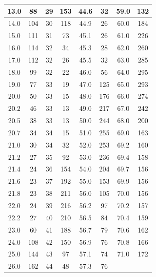 \documentclass[UTF8,10pt,a4paper]{article}
\begin{document}
\begin{table}[h]
\begin{tabular}{|c|c|c|c|c|c|c|c|}
    13.0 & 88 & 29 & 153 & 44.6 & 32 & 59.0 & 132 \\ \hline
    14.0 & 104 & 30 & 118 & 44.9 & 26 & 60.0 & 184 \\ \hline
    15.0 & 111 & 31 & 73 & 45.1 & 26 & 61.0 & 226 \\ \hline
    16.0 & 114 & 32 & 34 & 45.3 & 28 & 62.0 & 260 \\ \hline
    17.0 & 112 & 32 & 26 & 45.5 & 32 & 63.0 & 285 \\ \hline
    18.0 & 99 & 32 & 22 & 46.0 & 56 & 64.0 & 295 \\ \hline
    19.0 & 77 & 33 & 19 & 47.0 & 125 & 65.0 & 293 \\ \hline
    20.0 & 50 & 33 & 15 & 48.0 & 176 & 66.0 & 274 \\ \hline
    20.2 & 46 & 33 & 13 & 49.0 & 217 & 67.0 & 242 \\ \hline
    20.5 & 38 & 33 & 13 & 50.0 & 244 & 68.0 & 200 \\ \hline
    20.7 & 34 & 34 & 15 & 51.0 & 255 & 69.0 & 163 \\ \hline
    21.0 & 30 & 34 & 32 & 52.0 & 253 & 69.2 & 160 \\ \hline
    21.2 & 27 & 35 & 92 & 53.0 & 236 & 69.4 & 158 \\ \hline
    21.4 & 24 & 36 & 154 & 54.0 & 204 & 69.7 & 156 \\ \hline
    21.6 & 23 & 37 & 192 & 55.0 & 153 & 69.9 & 156 \\ \hline
    21.8 & 23 & 38 & 211 & 56.0 & 105 & 70.0 & 156 \\ \hline
    22.0 & 24 & 39 & 216 & 56.2 & 97 & 70.2 & 157 \\ \hline
    22.2 & 27 & 40 & 210 & 56.5 & 84 & 70.4 & 159 \\ \hline
    23.0 & 60 & 41 & 188 & 56.7 & 79 & 70.6 & 162 \\ \hline
    24.0 & 108 & 42 & 150 & 56.9 & 76 & 70.8 & 166 \\ \hline
    25.0 & 144 & 43 & 97 & 57.1 & 74 & 71.0 & 172 \\ \hline
    26.0 & 162 & 44 & 48 & 57.3 & 76 &  &  \\ \hline
    \end{tabular}
\end{table}
\end{document}

